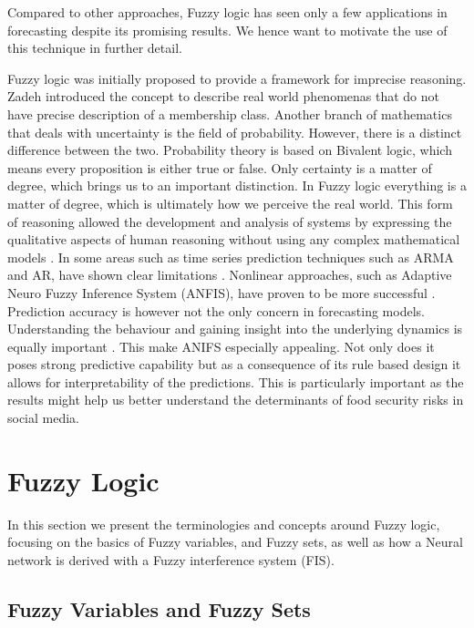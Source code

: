 Compared to other approaches, Fuzzy logic has seen only a few applications in forecasting despite its promising results. We hence want to motivate the use of this technique in further detail. 

Fuzzy logic was initially proposed to provide a framework for imprecise reasoning. Zadeh \cite{Zadeh65} introduced the concept to describe real world phenomenas that do not have precise description of a membership class. Another branch of mathematics that deals with uncertainty is the field of probability. However, there is a distinct difference between the two. Probability theory is based on Bivalent logic, which means every proposition is either true or false. Only certainty is a matter of degree, which brings us to an important distinction. In Fuzzy logic everything is a matter of degree, which is ultimately how we perceive the real world. This form of reasoning allowed the development and analysis of  systems by expressing the qualitative aspects of human reasoning without using any complex mathematical models \cite{Jang91}.  
In some areas such as time series prediction techniques such as ARMA and AR, have shown clear limitations \cite{box90}. Nonlinear approaches, such as Adaptive Neuro Fuzzy Inference System (ANFIS), have proven to be more successful \cite{chap04}. Prediction accuracy is however not the only concern in forecasting models. Understanding the behaviour and gaining insight into the underlying dynamics is equally important \cite{neil93}. This make ANIFS especially appealing. Not only does it poses strong predictive capability but as a consequence of its rule based design it allows for interpretability of the predictions. This is particularly important as the results might help us better understand the determinants of food security risks in social media. 

\section{Fuzzy Logic}


In this section we present the terminologies and concepts around Fuzzy logic, focusing on the basics of Fuzzy variables, and Fuzzy sets, as well as how a Neural network is derived with a Fuzzy interference system (FIS). 

\subsection {Fuzzy Variables and Fuzzy Sets }

